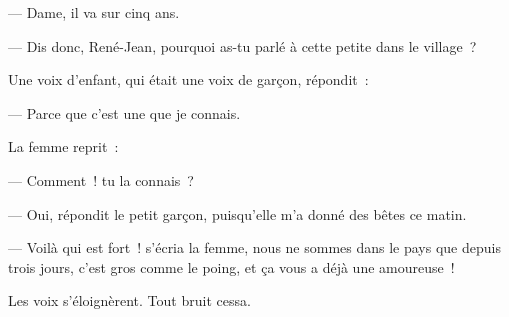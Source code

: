 \documentclass[french,twoside]{book} %
\begin{document}
— Dame, il va sur cinq ans.\par
— Dis donc, René-Jean, pourquoi as-tu parlé à cette petite dans le village ?\par
Une voix d’enfant, qui était une voix de garçon, répondit :\par
— Parce que c’est une que je connais.\par
La femme reprit :\par
— Comment ! tu la connais ?\par
— Oui, répondit le petit garçon, puisqu’elle m’a donné des bêtes ce matin.\par
— Voilà qui est fort ! s’écria la femme, nous ne sommes dans le pays que depuis trois jours, c’est gros comme le poing, et ça vous a déjà une amoureuse !\par
Les voix s’éloignèrent. Tout bruit cessa.
\end{document}
